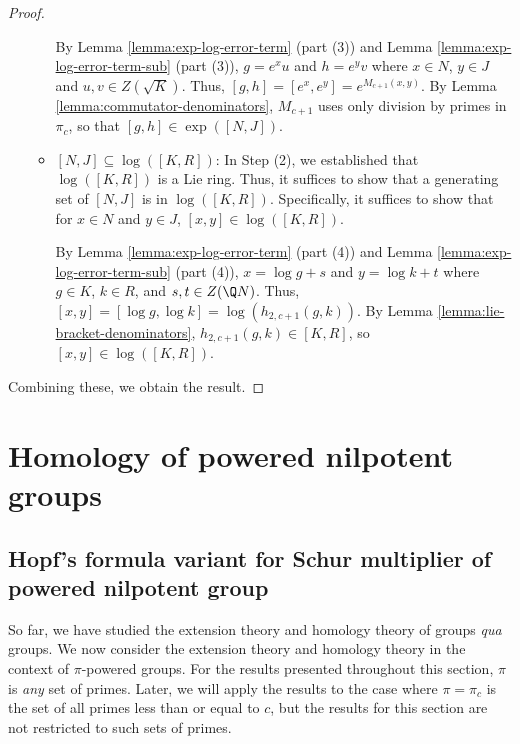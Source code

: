 \documentclass{ucetd}
\begin{document}
\begin{proof}
\begin{enumerate}
\begin{itemize}
      By Lemma \ref{lemma:exp-log-error-term} (part (3)) and Lemma
      \ref{lemma:exp-log-error-term-sub} (part (3)), $g = e^xu$ and $h
      = e^yv$ where $x \in N$, $y \in J$ and $u,v \in
      Z(\sqrt{K})$. Thus, $[g,h] = [e^x,e^y] = e^{M_{c+1}(x,y)}$. By
      Lemma \ref{lemma:commutator-denominators}, $M_{c+1}$ uses only
      division by primes in $\pi_c$, so that $[g,h] \in \exp([N,J])$.

    \item $[N,J] \subseteq \log([K,R])$: In Step (2), we established
      that $\log([K,R])$ is a Lie ring. Thus, it suffices to show that
      a generating set of $[N,J]$ is in $\log([K,R])$.  Specifically,
      it suffices to show that for $x \in N$ and $y \in J$, $[x,y] \in
      \log([K,R])$.

      By Lemma \ref{lemma:exp-log-error-term} (part (4)) and Lemma
      \ref{lemma:exp-log-error-term-sub} (part (4)), $x = \log g + s$
      and $y = \log k + t$ where $g \in K$, $k \in R$, and $s,t \in
      Z(\Q N)$. Thus, $[x,y] = [\log g, \log k] =
      \log(h_{2,c+1}(g,k))$. By Lemma
      \ref{lemma:lie-bracket-denominators}, $h_{2,c+1}(g,k) \in
          [K,R]$, so $[x,y] \in \log([K,R])$.
    \end{itemize}
  \end{enumerate}

  Combining these, we obtain the result.
\end{proof}


\section{Homology of powered nilpotent groups}\label{sec:homology-of-powered-nilpotent-groups}

\subsection{Hopf's formula variant for Schur multiplier of powered nilpotent group}\label{sec:hopf-formula-pi-powered}

So far, we have studied the extension theory and homology theory of
groups {\em qua} groups. We now consider the extension theory and
homology theory in the context of $\pi$-powered groups. For the
results presented throughout this section, $\pi$ is {\em any} set of
primes. Later, we will apply the results to the case where $\pi =
\pi_c$ is the set of all primes less than or equal to $c$, but the
results for this section are not restricted to such sets of primes.
\end{document}
